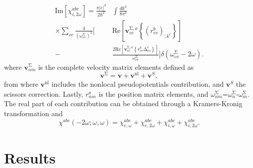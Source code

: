 \documentclass[pss]{wiley2sp} %
\begin{document}
\begin{subequations}
\begin{align}
\mathrm{Im}[\chi^{abc}_{i,2\omega}]= 
\frac{\pi \vert e\vert^{3}}{2\hbar^2}
&
\int \frac{dk^3}{8\pi^3}
\nonumber \\
\times \sum_{vc}\frac{4}{(\omega^\mathrm{\Sigma}_{cv})^{2}}
\Bigg[ 
&
\mathrm{Re}\left[\mathbf{v}^{\mathrm{\Sigma},a}_{vc}\left\{
\left(r^{b}_{cv}\right)_{;k^{c}}\right\}\right] 
\nonumber \\
-
&
\frac{2\mathrm{Re}
\left[\mathbf{v}^{\mathrm{\Sigma},a}_{vc}\left\{
r^{b}_{cv}
\mathrm{\Delta}^{c}_{cv}\right\}\right]}{\omega^\mathrm{\Sigma}_{cv}}
\Bigg]
\delta(\omega^\mathrm{\Sigma}_{cv}-2\omega)
.
\end{align}
\end{subequations}
where $\mathbf{v}^{\mathrm{\Sigma}}_{nm}$ is the complete velocity matrix elements defined as
\begin{equation}\label{eq:nonlocal}
\mathbf{v}^{\mathrm{\Sigma}}=\mathbf{v}+\mathbf{v}^{\mathrm{nl}}+\mathbf{v}^{S},
\end{equation}
from where $\mathbf{v}^{\mathrm{nl}}$ includes the nonlocal pseudopotentials contribution, and $\mathbf{v}^{S}$ the scissors correction. Lastly, $r^{a}_{nm}$ is the position matrix elements, and $\omega^\mathrm{\Sigma}_{nm}$=$\omega^{\mathrm{\Sigma}}_{n}$-$\omega^{\mathrm{\Sigma}}_{m}$. The real part of each contribution can be obtained through a Kramers-Kronig transformation \cite{tancognePRB14} and
\begin{equation*}\label{eq:chitotal}
    \chi^{abc} (-2\omega;\omega,\omega) = \chi^{abc}_{e,\omega} + \chi^{abc}_{e,2\omega} +
    \chi^{abc}_{i,\omega} + \chi^{abc}_{i,2\omega}
    .
\end{equation*}

\section{Results}\label{sec:results}
\end{document}
